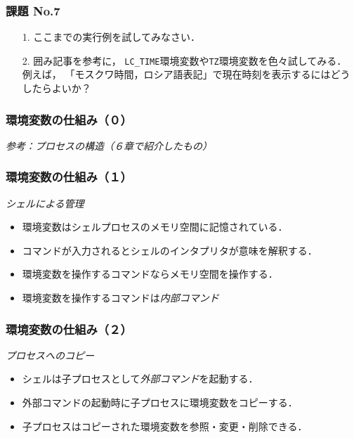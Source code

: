 \documentclass{beamer}                 %
\begin{document}
\begin{frame}[fragile]
  \frametitle{課題 No.7}
  \begin{enumerate}
  \item[1.] ここまでの実行例を試してみなさい．
    \vfill
  \item[2.]  囲み記事を参考に，
    \texttt{LC\_TIME}環境変数や\texttt{TZ}環境変数を色々試してみる．
    例えば，
    「モスクワ時間，ロシア語表記」で現在時刻を表示するにはどうしたらよいか？
  \end{enumerate}
  \vfill
\end{frame}

\begin{frame}[fragile]
  \frametitle{環境変数の仕組み（０）}
  \emph{参考：プロセスの構造（６章で紹介したもの）}
\end{frame}

\begin{frame}[fragile]
  \frametitle{環境変数の仕組み（１）}
  \emph{シェルによる管理}
  \begin{itemize}
  \item 環境変数はシェルプロセスのメモリ空間に記憶されている．
  \item コマンドが入力されるとシェルのインタプリタが意味を解釈する．
  \item 環境変数を操作するコマンドならメモリ空間を操作する．
  \item 環境変数を操作するコマンドは\emph{内部コマンド}
  \end{itemize}
\end{frame}

\begin{frame}[fragile]
  \frametitle{環境変数の仕組み（２）}
  \emph{プロセスへのコピー}
  \begin{itemize}
  \item シェルは子プロセスとして\emph{外部コマンド}を起動する．
  \item 外部コマンドの起動時に子プロセスに環境変数をコピーする．
  \item 子プロセスはコピーされた環境変数を参照・変更・削除できる．
  \end{itemize}
\end{frame}
\end{document}
